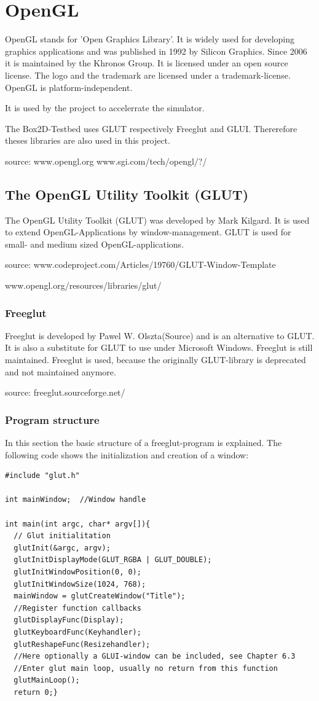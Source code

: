 \documentclass[10pt,a4paper,DIV=11]{scrreprt}
\begin{document}
\chapter{OpenGL}
OpenGL stands for 'Open Graphics Library'. It is widely used for developing graphics applications and was published in 1992 by Silicon Graphics. Since 2006 it is maintained by the Khronos Group. It is licensed under an open source license. The logo and the trademark are licensed under a trademark-license.
OpenGL is platform-independent.


It is used by the project to accelerrate the simulator.

The Box2D-Testbed uses GLUT respectively Freeglut and GLUI. Thererefore theses libraries are also used in this project.

source: www.opengl.org
www.sgi.com/tech/opengl/?/


\section{The OpenGL Utility Toolkit (GLUT)}
The OpenGL Utility Toolkit (GLUT) was developed by Mark Kilgard. It is used to extend OpenGL-Applications by window-management. GLUT is used for small- and medium sized OpenGL-applications.

source: www.codeproject.com/Articles/19760/GLUT-Window-Template

www.opengl.org/resources/libraries/glut/

\subsection{Freeglut}
Freeglut is developed by Pawel W. Olszta(Source) and is an alternative to GLUT. It is also a substitute for GLUT to use under Microsoft Windows. Freeglut is still maintained. Freeglut is used, because the originally GLUT-library is deprecated and not maintained anymore.

source: freeglut.sourceforge.net/

\subsection{Program structure}
In this section the basic structure of a freeglut-program is explained.
The following code shows the initialization and creation of a window:

\begin{lstlisting}[caption={Initialization of a GLUT program},label=lst:glut-init]
#include "glut.h"

int mainWindow;  //Window handle

int main(int argc, char* argv[]){
  // Glut initialitation
  glutInit(&argc, argv);
  glutInitDisplayMode(GLUT_RGBA | GLUT_DOUBLE);
  glutInitWindowPosition(0, 0); 
  glutInitWindowSize(1024, 768);
  mainWindow = glutCreateWindow("Title");
  //Register function callbacks
  glutDisplayFunc(Display);
  glutKeyboardFunc(Keyhandler);
  glutReshapeFunc(Resizehandler);
  //Here optionally a GLUI-window can be included, see Chapter 6.3
  //Enter glut main loop, usually no return from this function
  glutMainLoop(); 
  return 0;}
\end{lstlisting}
\end{document}
